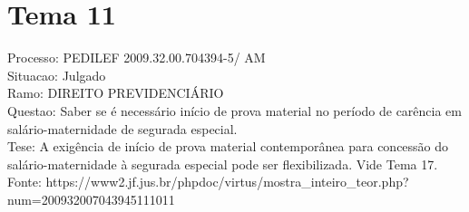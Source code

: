 \documentclass[12pt]{article}
\begin{document}
\section*{Tema 11}
Processo: PEDILEF 2009.32.00.704394-5/ AM\\
Situacao: Julgado\\
Ramo: DIREITO PREVIDENCIÁRIO\\
Questao: Saber se é necessário início de prova material no período de carência em salário-maternidade de segurada especial.\\
Tese: A exigência de início de prova material contemporânea para concessão do salário-maternidade à segurada especial pode ser flexibilizada. Vide Tema 17.\\
Fonte: https://www2.jf.jus.br/phpdoc/virtus/mostra\_inteiro\_teor.php?num=200932007043945111011
\end{document}
